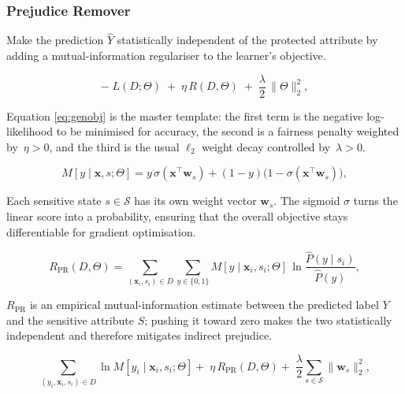 \documentclass[12pt,a4paper,openright,twoside]{book}
\begin{document}
\subsubsection{Prejudice Remover} Make the prediction \begin{math}\widehat{Y}\end{math} statistically independent of the protected attribute by adding a mutual-information regulariser to the learner’s objective.


\begin{equation}
-\;L(D;\Theta)\;+\;\eta\,R(D,\Theta)\;+\;
\frac{\lambda}{2}\,\lVert\Theta\rVert_{2}^{2},
\tag{7}\label{eq:genobj}
\end{equation}

\noindent
Equation \eqref{eq:genobj} is the master template: the first term is the negative log-likelihood to be minimised for accuracy, the second is a fairness penalty weighted by~\(\eta>0\), and the third is the usual \(\ell_{2}\) weight decay controlled by~\(\lambda>0\).

\begin{equation}
M[y\mid\mathbf{x},s;\Theta]=
y\,\sigma(\mathbf{x}^{\top}\mathbf{w}_{s})+
(1-y)\bigl(1-\sigma(\mathbf{x}^{\top}\mathbf{w}_{s})\bigr),
\tag{8}\label{eq:logmodel}
\end{equation}

\noindent
Each sensitive state \(s\in\mathcal{S}\) has its own weight vector \(\mathbf{w}_{s}\).  The sigmoid \(\sigma\) turns the linear score into a probability, ensuring that the overall objective stays differentiable for gradient optimisation.

\begin{equation}
R_{\mathrm{PR}}(D,\Theta)=
\sum_{(\mathbf{x}_i,s_i)\in D}
\sum_{y\in\{0,1\}}
M[y\mid\mathbf{x}_i,s_i;\Theta]\,
\ln\frac{\hat{P}(y\mid s_i)}{\hat{P}(y)},
\tag{11}\label{eq:rpr}
\end{equation}

\noindent
\(R_{\mathrm{PR}}\) is an empirical mutual-information estimate between the predicted label \(Y\) and the sensitive attribute \(S\); pushing it toward zero makes the two statistically independent and therefore mitigates indirect prejudice.

\begin{equation}
\sum_{(y_i,\mathbf{x}_i,s_i)\in D}
\ln M[y_i\mid\mathbf{x}_i,s_i;\Theta]
+\;
\eta\,R_{\mathrm{PR}}(D,\Theta)
+\;
\frac{\lambda}{2}\sum_{s\in\mathcal{S}}\lVert\mathbf{w}_{s}\rVert_{2}^{2},
\tag{12}\label{eq:logobj}
\end{equation}
\end{document}
